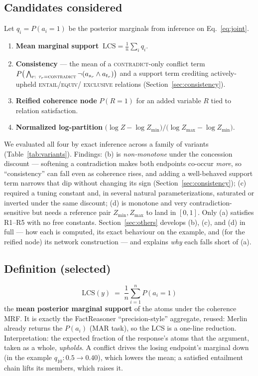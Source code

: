 \documentclass[11pt]{article}
\begin{document}
\subsection{Candidates considered}
Let $q_i=P(a_i{=}1)$ be the posterior marginals from inference on
Eq.~\eqref{eq:joint}.
\begin{enumerate}[leftmargin=*,label=(\alph*)]
  \item \textbf{Mean marginal support} $\ \mathrm{LCS}=\frac1n\sum_i q_i$.
  \item \textbf{Consistency} --- the mean of a \textsc{contradict}-only conflict term
        $P\big(\bigwedge_{r:\ \tau_r=\textsc{contradict}}\neg(a_{s_r}\wedge a_{t_r})\big)$
        and a support term crediting actively-upheld \textsc{entail}/\textsc{equiv}/%
        \textsc{exclusive} relations (Section~\ref{sec:consistency}).
  \item \textbf{Reified coherence node} $P(R{=}1)$ for an added variable $R$ tied to relation
        satisfaction.
  \item \textbf{Normalized log-partition} $\big(\log Z - \log Z_{\min}\big)/\big(\log Z_{\max}-\log Z_{\min}\big)$.
\end{enumerate}
We evaluated all four by exact inference across a family of variants
(Table~\ref{tab:variants}). Findings: (b) is \emph{non-monotone} under the concession
discount --- softening a contradiction makes both endpoints co-occur \emph{more}, so
``consistency'' can fall even as coherence rises, and adding a well-behaved support term
narrows that dip without changing its sign (Section~\ref{sec:consistency}); (c) required a
tuning constant and, in
several natural parameterizations, saturated or inverted under the same discount; (d) is
monotone and very contradiction-sensitive but needs a reference pair $Z_{\min},Z_{\max}$ to
land in $[0,1]$. Only (a) satisfies R1--R5 with no free constants. Section~\ref{sec:others}
develops (b), (c), and (d) in full --- how each is computed, its exact behaviour on the
example, and (for the reified node) its network construction --- and explains \emph{why}
each falls short of (a).

\subsection{Definition (selected)}
\begin{equation}
  \boxed{\ \ \mathrm{LCS}(y)\;=\;\frac{1}{n}\sum_{i=1}^{n} P(a_i{=}1)\ \ }
  \label{eq:lcs}
\end{equation}
the \textbf{mean posterior marginal support} of the atoms under the coherence MRF. It is
exactly the FactReasoner ``precision-style'' aggregate, reused: Merlin already returns the
$P(a_i)$ (MAR task), so the LCS is a one-line reduction. Interpretation: the expected
fraction of the response's atoms that the argument, taken as a whole, \emph{upholds}. A
conflict drives the losing endpoint's marginal down (in the example
$q_{10}{:}0.5\!\to\!0.40$), which lowers the mean; a satisfied entailment chain lifts its
members, which raises it.
\end{document}
